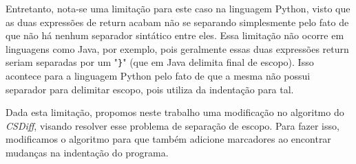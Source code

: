 Entretanto, nota-se uma limitação para este caso na linguagem Python, visto que as duas expressões de return acabam não
se separando simplesmente pelo fato de que não há nenhum separador sintático entre eles.
Essa limitação não ocorre em linguagens
como Java, por exemplo, pois geralmente essas duas expressões return seriam separadas por um "\verb|}|"
(que em Java delimita final de escopo). Isso acontece
para a linguagem Python pelo fato de que a mesma não possui separador para delimitar escopo, pois utiliza da indentação para tal.

Dada esta limitação, propomos neste trabalho uma modificação no algoritmo do \emph{CSDiff}, visando resolver esse problema de
separação de escopo. Para fazer isso, modificamos o algoritmo para que também adicione marcadores ao encontrar mudanças na
indentação do programa.

